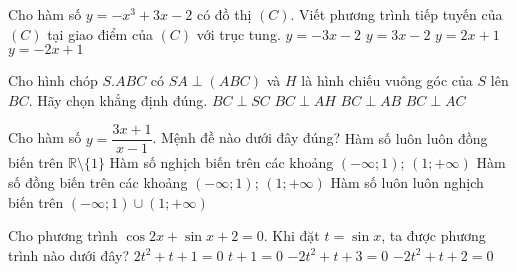 \begin{ex}%
	Cho hàm số $y=-x^3+3x-2$ có đồ thị $(C)$. Viết phương trình tiếp tuyến của $(C)$ tại giao điểm của $(C)$ với trục tung.
	\choice
	{$y=-3x-2 $}
	{\True $y=3x-2 $}
	{$y=2x+1 $}
	{$y=-2x+1 $}
\end{ex}
\begin{ex}%
	Cho hình chóp $S.ABC$ có $SA\perp (ABC)$ và $H$ là hình chiếu vuông góc của $S$ lên $BC$. Hãy chọn khẳng định đúng.
	\choice
	{$BC\perp SC$}
	{\True $BC\perp AH $}
	{$BC\perp AB $}
	{$BC\perp AC $}
\end{ex}
\begin{ex}%
	Cho hàm số $y=\dfrac{3x+1}{x-1}$. Mệnh đề nào dưới đây đúng?
	\choice
	{Hàm số luôn luôn đồng biến trên $\mathbb{R}\setminus \{1\} $}
	{\True Hàm số nghịch biến trên các khoảng $(-\infty;1)$; $(1;+\infty) $}
	{Hàm số đồng biến trên các khoảng $(-\infty;1)$; $(1;+\infty) $}
	{Hàm số luôn luôn nghịch biến trên $(-\infty;1)\cup (1;+\infty) $}
\end{ex}
\begin{ex}%
	Cho phương trình $\cos 2x+\sin x+2=0$. Khi đặt $t=\sin x$, ta được phương trình nào dưới đây?
	\choice
	{$2t^2+t+1=0 $}
	{$t+1=0 $}
	{\True $-2t^2+t+3=0 $}
	{$-2t^2+t+2=0 $}
\end{ex}
